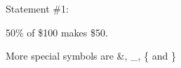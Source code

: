 \documentclass{article}
\begin{document}
Statement \#1:

50\% of \$100 makes \$50.

More special symbols are \&, \_, \{ and \}
\end{document}
